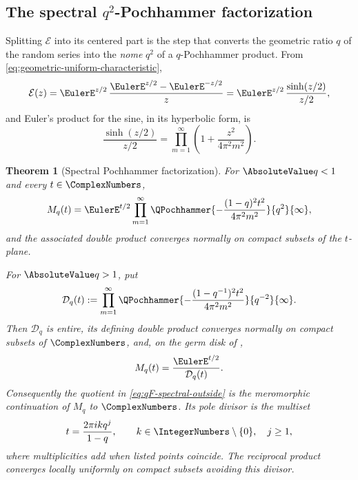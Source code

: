 \documentclass[11pt,a4paper,oneside,openany]{book}
\newtheorem{theorem}{Theorem}[chapter]
\theoremstyle{definition}
\theoremstyle{remark}
\begin{document}
\subsection{The spectral \texorpdfstring{$q^2$}{q2}-Pochhammer factorization}

Splitting $\mathcal E$ into its centered part is the step that converts the
geometric ratio $q$ of the random series into the \emph{nome} $q^2$ of a
$q$-Pochhammer product.  From \eqref{eq:geometric-uniform-characteristic},
\begin{equation}\label{eq:qF-Ecal-centered}
 \mathcal E(z)
 =\EulerE^{z/2}\,\frac{\EulerE^{z/2}-\EulerE^{-z/2}}{z}
 =\EulerE^{z/2}\,\frac{\sinh(z/2)}{z/2},
\end{equation}
and Euler's product for the sine, in its hyperbolic form, is
\begin{equation}\label{eq:qF-sinh-product}
 \frac{\sinh(z/2)}{z/2}
 =\prod_{m=1}^{\infty}\left(1+\frac{z^2}{4\pi^2m^2}\right).
\end{equation}

\begin{theorem}[Spectral Pochhammer factorization]\label{thm:qF-spectral}
For $\AbsoluteValue q<1$ and every $t\in\ComplexNumbers$,
\begin{equation}\label{eq:qF-spectral-inside}
 M_q(t)=\EulerE^{t/2}\prod_{m=1}^{\infty}
 \QPochhammer{-\dfrac{(1-q)^2t^2}{4\pi^2m^2}}{q^2}{\infty},
\end{equation}
and the associated double product converges normally on compact subsets of
the $t$-plane.

For $\AbsoluteValue q>1$, put
\[
 \mathcal D_q(t):=\prod_{m=1}^{\infty}
 \QPochhammer{-\dfrac{(1-q^{-1})^2t^2}{4\pi^2m^2}}{q^{-2}}{\infty}.
\]
Then $\mathcal D_q$ is entire, its defining double product converges normally on
compact subsets of $\ComplexNumbers$, and, on the germ disk of
,
\begin{equation}\label{eq:qF-spectral-outside}
 M_q(t)=\frac{\EulerE^{t/2}}{\mathcal D_q(t)}.
\end{equation}
Consequently the quotient in \eqref{eq:qF-spectral-outside} is the meromorphic
continuation of $M_q$ to $\ComplexNumbers$.  Its pole divisor is the multiset
\[
 t=\frac{2\pi i kq^j}{1-q},
 \qquad k\in\IntegerNumbers\setminus\{0\},\quad j\ge1,
\]
where multiplicities add when listed points coincide.  The reciprocal product
converges locally uniformly on compact subsets avoiding this divisor.
\end{theorem}
\end{document}
